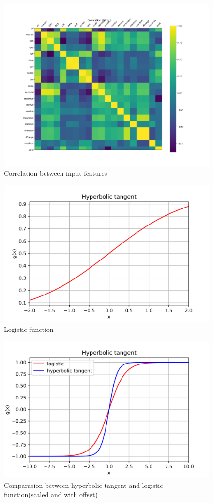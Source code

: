 \documentclass[a4paper]{article}
\begin{document}
\begin{figure}[H]
    \centering
    \includegraphics[width=12cm]{correlation}
    \caption{Correlation between input features}
    \label{fig:pre-ex1-correlation}
\end{figure}

\begin{figure}[H]
    \centering
    \includegraphics[width=12cm]{logistic_function}
    \caption{Logistic function}
    \label{fig:pre-ex1-logistic}
\end{figure}

\begin{figure}[H]
    \centering
    \includegraphics[width=12cm]{logistic_vs_tanh}
    \caption{Comparasion between hyperbolic tangent and logistic function(scaled and with offset)}
    \label{fig:pre-ex1-logistic_tanh}
\end{figure}
\end{document}
